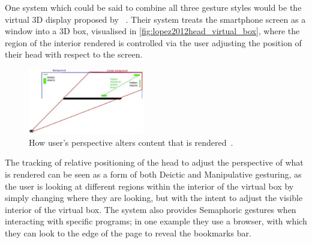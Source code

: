 One system which could be said to combine all three gesture styles would be the virtual 3D display proposed by \citeauthor{lopez2012head}~\cite{lopez2012head}.
Their system treats the smartphone screen as a window into a 3D box, visualised in \autoref{fig:lopez2012head_virtual_box}, where the region of the interior rendered is controlled via the user adjusting the position of their head with respect to the screen.
\begin{figure}
    \centering
    \includegraphics[width=0.45\textwidth]{figures/lopex_etal_virtual_box.png}
    \caption{\label{fig:lopez2012head_virtual_box}How user's perspective alters content that is rendered~\cite{lopez2012head}.}
\end{figure}
The tracking of relative positioning of the head to adjust the perspective of what is rendered can be seen as a form of both Deictic and Manipulative gesturing, as the user is looking at different regions within the interior of the virtual box by simply changing where they are looking, but with the intent to adjust the visible interior of the virtual box.
The system also provides Semaphoric gestures when interacting with specific programs; in one example they use a browser, with which they can look to the edge of the page to reveal the bookmarks bar.




